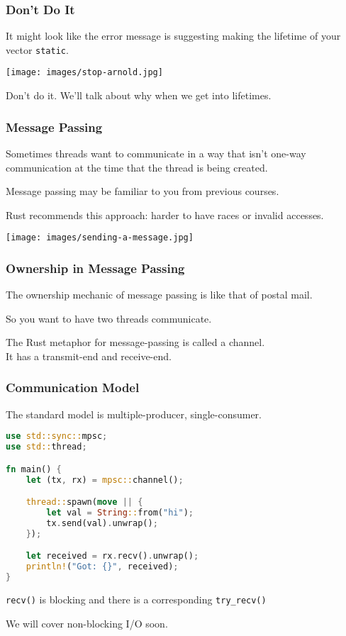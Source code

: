 \begin{frame}
\frametitle{Don't Do It}

It might look like the error message is suggesting making the lifetime of your vector \texttt{static}.

\begin{center}
	\texttt{[image: images/stop-arnold.jpg]}
\end{center}

Don't do it. We'll talk about why when we get into lifetimes.

\end{frame}


\begin{frame}
\frametitle{Message Passing}

Sometimes threads want to communicate in a way that isn't one-way communication at the time that the thread is being created.

Message passing may be familiar to you from previous courses.

Rust recommends this approach: harder to have races or invalid accesses.

\begin{center}
	\texttt{[image: images/sending-a-message.jpg]}
\end{center}

\end{frame}


\begin{frame}
\frametitle{Ownership in Message Passing}

The ownership mechanic of message passing is like that of postal mail. 

So you want to have two threads communicate. 

The Rust metaphor for message-passing is called a \alert{channel}.\\
\quad It has a transmit-end and receive-end.

\end{frame}


\begin{frame}[fragile]
\frametitle{Communication Model}
The standard model is multiple-producer, single-consumer.

\begin{lstlisting}[language=Rust]
use std::sync::mpsc;
use std::thread;

fn main() {
    let (tx, rx) = mpsc::channel();

    thread::spawn(move || {
        let val = String::from("hi");
        tx.send(val).unwrap();
    });

    let received = rx.recv().unwrap();
    println!("Got: {}", received);
}
\end{lstlisting}

\texttt{recv()} is blocking and there is a corresponding \texttt{try\_recv()} 

We will cover non-blocking I/O soon.

\end{frame}


